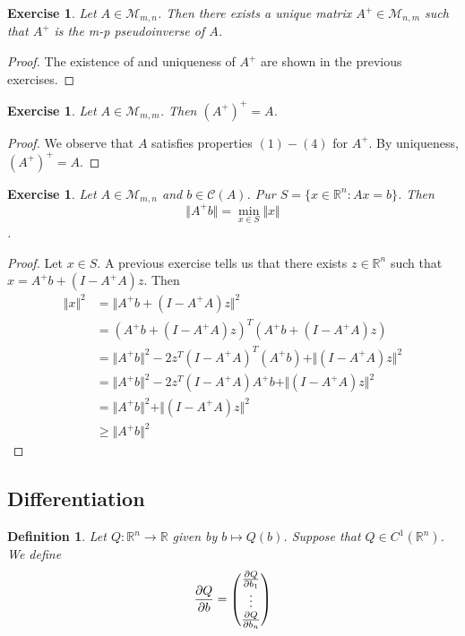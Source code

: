 \documentclass[12pt]{amsart}
\newtheorem{defn}[thm]{Definition}
\newtheorem{ex}[thm]{Exercise}
\newcommand{\R}{\mathbb{R}}
\newcommand{\MC}{\mathcal{C}}
\newcommand{\MM}{\mathcal{M}}
\newcommand{\n}{\Vert}
\begin{document}
\begin{ex} Let $A \in \MM_{m,n}$. Then there exists a unique matrix $A^+ \in \MM_{n,m}$ such that $A^+$ is the m-p pseudoinverse of $A$. 
\end{ex}

\begin{proof}
The existence of and uniqueness of $A^+$ are shown in the previous exercises. 
\end{proof}

\begin{ex}
Let $A \in \MM_{m,m}$. Then $(A^+)^+ = A$.
\end{ex}

\begin{proof}
We observe that $A$ satisfies properties $(1)-(4)$ for $A^+$. By uniqueness, $(A^+)^+ = A$.
\end{proof}

\begin{ex}
Let $A \in \MM_{m,n}$ and $b \in \MC(A)$. Pur $S = \{x \in \R^n: Ax= b\}$. Then $$\n A^+b \n = \min_{x \in S}\n x \n$$.
\end{ex}

\begin{proof} Let $x \in S$. A previous exercise tells us that there exists $z \in \R^n$ such that $x = A^+b + (I-A^+A)z$. Then 
\begin{align*} 
\n x \n^2
&= \n A^+b + (I-A^+A)z \n^2 \\
&= (A^+b + (I-A^+A)z)^T(A^+b + (I-A^+A)z) \\
&= \n A^+b \n^2 - 2z^T(I-A^+A)^T(A^+b) + \n (I-A^+A)z \n^2 \\
&= \n A^+b \n^2 - 2z^T(I-A^+A)A^+b + \n (I-A^+A)z \n^2 \\
&= \n A^+b \n^2 + \n (I-A^+A)z \n^2 \\
& \geq \n A^+b \n^2
\end{align*}
\end{proof}

\subsection{Differentiation}

\begin{defn}
Let $Q:\R^n \rightarrow \R$ given by $b \mapsto Q(b)$. Suppose that $Q \in C^1(\R^n)$.  We define 
\[ 
\pdv{Q}{b}= 
\begin{pmatrix} 
\pdv{Q}{b_1}  \\
\vdots\\
\pdv{Q}{b_n}
\end{pmatrix}  
\]
\end{defn}
\end{document}
